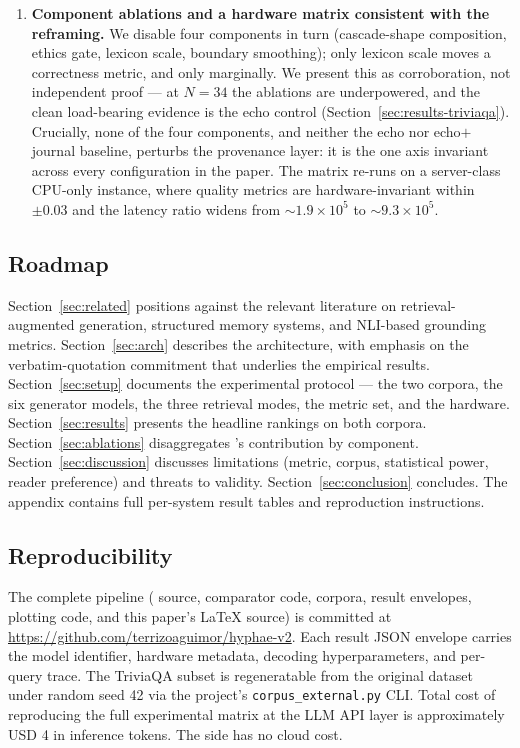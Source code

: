 \begin{enumerate}
    \item \textbf{Component ablations and a hardware matrix
    consistent with the reframing.} We disable four \hyphae{}
    components in turn (cascade-shape composition, ethics gate,
    lexicon scale, boundary smoothing); only lexicon scale moves a
    correctness metric, and only marginally. We present this as
    corroboration, not independent proof --- at $N=34$ the ablations
    are underpowered, and the clean load-bearing evidence is the
    echo control (Section~\ref{sec:results-triviaqa}). Crucially,
    none of the four components, and neither the echo nor
    echo$+$journal baseline, perturbs the provenance layer: it is
    the one axis invariant across every configuration in the paper.
    The matrix re-runs on a server-class CPU-only instance, where
    quality metrics are hardware-invariant within $\pm 0.03$ and the
    latency ratio widens from $\sim 1.9\times10^5$ to
    $\sim 9.3\times10^5$.
\end{enumerate}

\subsection{Roadmap}

Section~\ref{sec:related} positions \hyphae{} against the relevant
literature on retrieval-augmented generation, structured memory
systems, and NLI-based grounding metrics. Section~\ref{sec:arch}
describes the architecture, with emphasis on the verbatim-quotation
commitment that underlies the empirical results.
Section~\ref{sec:setup} documents the experimental protocol --- the
two corpora, the six generator models, the three retrieval modes,
the metric set, and the hardware. Section~\ref{sec:results}
presents the headline rankings on both corpora.
Section~\ref{sec:ablations} disaggregates \hyphae{}'s contribution
by component. Section~\ref{sec:discussion} discusses limitations
(metric, corpus, statistical power, reader preference) and threats
to validity. Section~\ref{sec:conclusion} concludes. The appendix
contains full per-system result tables and reproduction instructions.

\subsection{Reproducibility}

The complete pipeline (\hyphae{} source, comparator code, corpora,
result envelopes, plotting code, and this paper's \LaTeX{} source)
is committed at \url{https://github.com/terrizoaguimor/hyphae-v2}.
Each result JSON envelope carries the model identifier, hardware
metadata, decoding hyperparameters, and per-query trace. The
TriviaQA subset is regeneratable from the original dataset under
random seed 42 via the project's
\texttt{corpus\_external.py} CLI. Total cost of reproducing the
full experimental matrix at the LLM API layer is approximately
USD 4 in inference tokens. The \hyphae{} side has no cloud cost.
